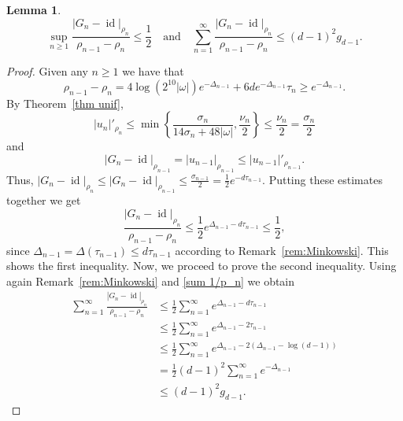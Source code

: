 \documentclass[12pt,reqno,a4paper]{amsart}%
\numberwithin{equation}{section}
\newtheorem{lemma}[theorem]{Lemma}
\newcommand{\id}  {\operatorname{id}}
\begin{document}
\begin{lemma}\label{lem: hypothesis for conjugacy}
$$
\sup_{n\geq1} \frac{|G_n-\id|_{\rho_n}}{\rho_{n-1}-\rho_{n}}\leq \frac12 \quad\text{and}\quad \sum_{n=1}^\infty \frac{|G_n-\id|_{\rho_n}}{\rho_{n-1}-\rho_{n}}\leq (d-1)^2g_{d-1}.
$$
\end{lemma}

\begin{proof}
Given any $n\geq1$ we have that
$$
\rho_{n-1} -\rho_n = 4\log (2^{10}|\omega|)e^{-\Delta_{n-1}} + 6d e^{-\Delta_{n-1}}\tau_n\geq e^{-\Delta_{n-1}}.
$$
By Theorem~\ref{thm unif}, 
$$
|u_n|'_{\rho_n}  \leq \min\left\{\frac{\sigma_{n}}{14\sigma_{n} + 48|\omega|},\frac{\nu_{n}}2\right\} \leq \frac{\nu_{n}}{2}= \frac{\sigma_n}{2}
$$
and
$$
|G_n-\id|_{\rho_{n-1}}=|u_{n-1}|_{\rho_{n-1}} \leq |u_{n-1}|'_{\rho_{n-1}}.
$$
Thus, $|G_n-\id|_{\rho_{n}}\leq |G_n-\id|_{\rho_{n-1}}\leq \frac{\sigma_{n-1}}{2}= \frac12 e^{-d\tau_{n-1}}$. Putting these estimates together we get
$$
\frac{|G_n-\id|_{\rho_n}}{\rho_{n-1}-\rho_{n}}\leq \frac12 e^{\Delta_{n-1}-d\tau_{n-1}}\leq \frac12,
$$
since $\Delta_{n-1}=\Delta(\tau_{n-1})\leq d \tau_{n-1}$ according to Remark~\ref{rem:Minkowski}. This shows the first inequality. Now,  we proceed to prove the second inequality. Using again Remark~\ref{rem:Minkowski} and  \eqref{sum 1/p_n} we obtain
\begin{align*}
\sum_{n=1}^\infty \frac{|G_n-\id|_{\rho_n}}{\rho_{n-1}-\rho_{n}}
&\leq \frac12 \sum_{n=1}^\infty e^{\Delta_{n-1}-d\tau_{n-1}}\\
&\leq\frac12 \sum_{n=1}^\infty e^{\Delta_{n-1}-2\tau_{n-1}}\\
&\leq\frac12 \sum_{n=1}^\infty e^{\Delta_{n-1}-2(\Delta_{n-1}-\log(d-1))}\\
&= \frac12(d-1)^2\sum_{n=1}^\infty e^{-\Delta_{n-1}}\\
&\leq (d-1)^2g_{d-1}.
\end{align*}
\end{proof}
\end{document}
